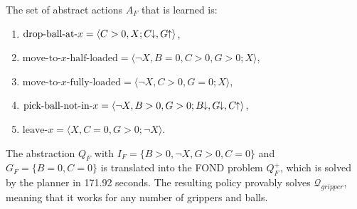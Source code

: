 \documentclass[letterpaper]{article} %
\newcommand{\Omit}[1]{}
\newcommand{\tup}[1]{\langle #1 \rangle}
\newcommand{\Q}{\mathcal{Q}}
\newcommand{\abst}[2]{\tup{#1;#2}}
\newcommand{\pplus}{\hspace{-.05em}\raisebox{.15ex}{\footnotesize$\uparrow$}}
\newcommand{\mminus}{\hspace{-.05em}\raisebox{.15ex}{\footnotesize$\downarrow$}}
\begin{document}
\noindent The set of  abstract actions $A_F$  that is learned is:

\begin{enumerate}[--]
  \item $\text{drop-ball-at-$x$}=\abst{C>0, X}{C\mminus, G \pplus}$,
  \item $\text{move-to-$x$-half-loaded}\! =\!  \abst{\neg X, B=0, C>0, G\!>\!0}{X}$,
  \item $\text{move-to-$x$-fully-loaded} = \abst{\neg X, C>0, G=0}{X}$,
  \item $\text{pick-ball-not-in-$x$} = \abst{\neg X, B > 0, G > 0}{B\mminus, G\mminus, C\pplus}$,
  \item $\text{leave-$x$} = \abst{X, C=0, G > 0}{\neg X}$.
\end{enumerate}

The abstraction $Q_F$ with $I_F\!=\!\{ B\!>\!0, \neg X, G\!>\!0, C\!=\!0\}$ and $G_F\!=\!\{ B\!=\!0, C\!=\!0 \}$ is
translated into the FOND problem $Q^+_F$, which is solved by the
planner in 171.92 seconds. The resulting policy provably solves $\Q_{gripper}$,
meaning that it works for any  number of grippers and balls.
\Omit{ %
The policy picks the balls in the source room, one by one, 
until the grippers are full or there are no more balls.
It then moves to the target room, with one of the two move actions above, 
according to whether the grippers are fully loaded or not,
and then drops the balls one by one, until the grippers
are all empty.  It then moves back to the other room if there   are still  balls
to be moved,  repeating the  process.
}

\end{document}
